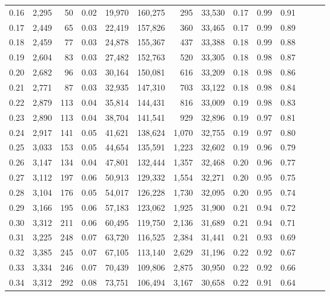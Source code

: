 \begin{tabular}{rrrrrrrrrrrrrr}
0.16 &  2,295 &   50 &  0.02 &   19,970 &  160,275 &     295 &  33,530 &  0.17 &  0.99 &      0.91 \\
0.17 &  2,449 &   65 &  0.03 &   22,419 &  157,826 &     360 &  33,465 &  0.17 &  0.99 &      0.89 \\
0.18 &  2,459 &   77 &  0.03 &   24,878 &  155,367 &     437 &  33,388 &  0.18 &  0.99 &      0.88 \\
0.19 &  2,604 &   83 &  0.03 &   27,482 &  152,763 &     520 &  33,305 &  0.18 &  0.98 &      0.87 \\
0.20 &  2,682 &   96 &  0.03 &   30,164 &  150,081 &     616 &  33,209 &  0.18 &  0.98 &      0.86 \\
0.21 &  2,771 &   87 &  0.03 &   32,935 &  147,310 &     703 &  33,122 &  0.18 &  0.98 &      0.84 \\
0.22 &  2,879 &  113 &  0.04 &   35,814 &  144,431 &     816 &  33,009 &  0.19 &  0.98 &      0.83 \\
0.23 &  2,890 &  113 &  0.04 &   38,704 &  141,541 &     929 &  32,896 &  0.19 &  0.97 &      0.81 \\
0.24 &  2,917 &  141 &  0.05 &   41,621 &  138,624 &   1,070 &  32,755 &  0.19 &  0.97 &      0.80 \\
0.25 &  3,033 &  153 &  0.05 &   44,654 &  135,591 &   1,223 &  32,602 &  0.19 &  0.96 &      0.79 \\
0.26 &  3,147 &  134 &  0.04 &   47,801 &  132,444 &   1,357 &  32,468 &  0.20 &  0.96 &      0.77 \\
0.27 &  3,112 &  197 &  0.06 &   50,913 &  129,332 &   1,554 &  32,271 &  0.20 &  0.95 &      0.75 \\
0.28 &  3,104 &  176 &  0.05 &   54,017 &  126,228 &   1,730 &  32,095 &  0.20 &  0.95 &      0.74 \\
0.29 &  3,166 &  195 &  0.06 &   57,183 &  123,062 &   1,925 &  31,900 &  0.21 &  0.94 &      0.72 \\
0.30 &  3,312 &  211 &  0.06 &   60,495 &  119,750 &   2,136 &  31,689 &  0.21 &  0.94 &      0.71 \\
0.31 &  3,225 &  248 &  0.07 &   63,720 &  116,525 &   2,384 &  31,441 &  0.21 &  0.93 &      0.69 \\
0.32 &  3,385 &  245 &  0.07 &   67,105 &  113,140 &   2,629 &  31,196 &  0.22 &  0.92 &      0.67 \\
0.33 &  3,334 &  246 &  0.07 &   70,439 &  109,806 &   2,875 &  30,950 &  0.22 &  0.92 &      0.66 \\
0.34 &  3,312 &  292 &  0.08 &   73,751 &  106,494 &   3,167 &  30,658 &  0.22 &  0.91 &      0.64 \\

\end{tabular}

